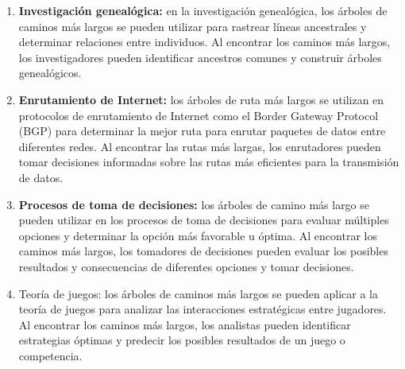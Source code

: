\begin{enumerate}
	\item \textbf{Investigación genealógica:} en la investigación genealógica, los árboles de caminos más largos se pueden utilizar para rastrear líneas ancestrales y determinar relaciones entre individuos. Al encontrar los caminos más largos, los investigadores pueden identificar ancestros comunes y construir árboles genealógicos.
	\item \textbf{ Enrutamiento de Internet:} los árboles de ruta más largos se utilizan en protocolos de enrutamiento de Internet como el Border Gateway Protocol (BGP) para determinar la mejor ruta para enrutar paquetes de datos entre diferentes redes. Al encontrar las rutas más largas, los enrutadores pueden tomar decisiones informadas sobre las rutas más eficientes para la transmisión de datos.
	\item \textbf{Procesos de toma de decisiones:} los árboles de camino más largo se pueden utilizar en los procesos de toma de decisiones para evaluar múltiples opciones y determinar la opción más favorable u óptima. Al encontrar los caminos más largos, los tomadores de decisiones pueden evaluar los posibles resultados y consecuencias de diferentes opciones y tomar decisiones.
	\item Teoría de juegos: los árboles de caminos más largos se pueden aplicar a la teoría de juegos para analizar las interacciones estratégicas entre jugadores. Al encontrar los caminos más largos, los analistas pueden identificar estrategias óptimas y predecir los posibles resultados de un juego o competencia.
\end{enumerate}
